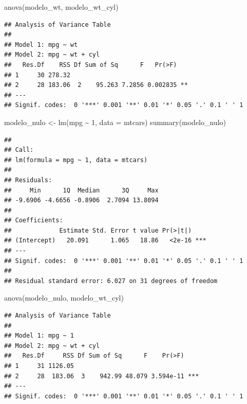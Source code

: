 \documentclass[
  12pt,
]{book}
\newenvironment{Shaded}{\begin{snugshade}}{\end{snugshade}}
\newcommand{\AttributeTok}[1]{\textcolor[rgb]{0.77,0.63,0.00}{#1}}
\newcommand{\DecValTok}[1]{\textcolor[rgb]{0.00,0.00,0.81}{#1}}
\newcommand{\FunctionTok}[1]{\textcolor[rgb]{0.00,0.00,0.00}{#1}}
\newcommand{\NormalTok}[1]{#1}
\newcommand{\OtherTok}[1]{\textcolor[rgb]{0.56,0.35,0.01}{#1}}
\newcommand{\SpecialCharTok}[1]{\textcolor[rgb]{0.00,0.00,0.00}{#1}}
\theoremstyle{definition}
\theoremstyle{definition}
\theoremstyle{definition}
\theoremstyle{definition}
\theoremstyle{remark}
\begin{document}
\begin{Shaded}
\begin{Highlighting}[]
\FunctionTok{anova}\NormalTok{(modelo\_wt, modelo\_wt\_cyl)}
\end{Highlighting}
\end{Shaded}

\begin{verbatim}
## Analysis of Variance Table
## 
## Model 1: mpg ~ wt
## Model 2: mpg ~ wt + cyl
##   Res.Df    RSS Df Sum of Sq      F   Pr(>F)   
## 1     30 278.32                                
## 2     28 183.06  2    95.263 7.2856 0.002835 **
## ---
## Signif. codes:  0 '***' 0.001 '**' 0.01 '*' 0.05 '.' 0.1 ' ' 1
\end{verbatim}

\begin{Shaded}
\begin{Highlighting}[]
\NormalTok{modelo\_nulo }\OtherTok{\textless{}{-}} \FunctionTok{lm}\NormalTok{(mpg }\SpecialCharTok{\textasciitilde{}} \DecValTok{1}\NormalTok{, }\AttributeTok{data =}\NormalTok{ mtcars)}
\FunctionTok{summary}\NormalTok{(modelo\_nulo)}
\end{Highlighting}
\end{Shaded}

\begin{verbatim}
## 
## Call:
## lm(formula = mpg ~ 1, data = mtcars)
## 
## Residuals:
##     Min      1Q  Median      3Q     Max 
## -9.6906 -4.6656 -0.8906  2.7094 13.8094 
## 
## Coefficients:
##             Estimate Std. Error t value Pr(>|t|)    
## (Intercept)   20.091      1.065   18.86   <2e-16 ***
## ---
## Signif. codes:  0 '***' 0.001 '**' 0.01 '*' 0.05 '.' 0.1 ' ' 1
## 
## Residual standard error: 6.027 on 31 degrees of freedom
\end{verbatim}

\begin{Shaded}
\begin{Highlighting}[]
\FunctionTok{anova}\NormalTok{(modelo\_nulo, modelo\_wt\_cyl)}
\end{Highlighting}
\end{Shaded}

\begin{verbatim}
## Analysis of Variance Table
## 
## Model 1: mpg ~ 1
## Model 2: mpg ~ wt + cyl
##   Res.Df     RSS Df Sum of Sq      F    Pr(>F)    
## 1     31 1126.05                                  
## 2     28  183.06  3    942.99 48.079 3.594e-11 ***
## ---
## Signif. codes:  0 '***' 0.001 '**' 0.01 '*' 0.05 '.' 0.1 ' ' 1
\end{verbatim}
\end{document}
